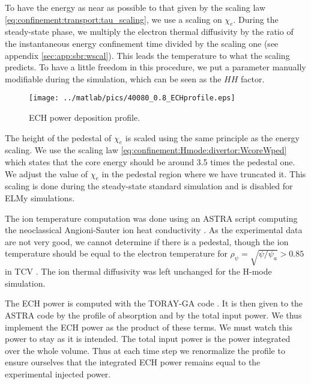 To have the energy as near as possible to that given by the scaling law \eqref{eq:confinement:transport:tau_scaling}, we use a scaling on $\chi_e$. During the steady-state phase, we multiply the electron thermal diffusivity by the ratio of the instantaneous energy confinement time divided by the scaling one (see appendix \ref{sec:app:sbr:wscal}). This leads the temperature to what the scaling predicts. To have a little freedom in this procedure, we put a parameter manually modifiable during the simulation, which can be seen as the $H\!H$ factor.

\begin{wrapfigure}{r}{6cm}
\vspace{-9mm}
\texttt{[image: ../matlab/pics/40080\_0.8\_ECHprofile.eps]}
\vspace{-7mm}
\caption{\footnotesize ECH power deposition profile.}
\vspace{-5mm}
\end{wrapfigure}
The height of the pedestal of $\chi_e$ is scaled using the same principle as the energy scaling. We use the scaling law \eqref{eq:confinement:Hmode:divertor:WcoreWped} which states that the core energy should be around 3.5 times the pedestal one. We adjust the value of $\chi_e$ in the pedestal region where we have truncated it. This scaling is done during the steady-state standard simulation and is disabled for ELMy simulations.

The ion temperature computation was done using an ASTRA script computing the neoclassical Angioni-Sauter ion heat conductivity \cite{angioni-sauter2000}. As the experimental data are not very good, we cannot determine if there is a pedestal, though the ion temperature should be equal to the electron temperature for $\rho_{\psi} = \sqrt{\psi / \psi_a} > 0.85$ in TCV \cite{andreas2010}. The ion thermal diffusivity was left unchanged for the H-mode simulation.

The ECH power is computed with the TORAY-GA code \cite{matsuda1989}. It is then given to the ASTRA code by the profile of absorption and by the total input power. We thus implement the ECH power as the product of these terms. We must watch this power to stay as it is intended. The total input power is the power integrated over the whole volume. Thus at each time step we renormalize the profile to ensure ourselves that the integrated ECH power remains equal to the experimental injected power.
